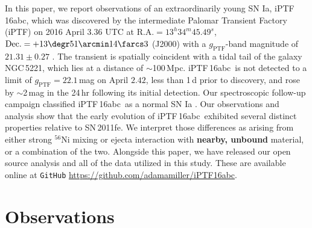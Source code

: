 \documentclass[twocolumn]{aastex61}
\newcommand{\abc}{iPTF\,16abc}
\begin{document}
In this paper, we report observations of an extraordinarily young SN Ia, \abc,
which was discovered by the intermediate Palomar Transient Factory (iPTF) on
2016 April $3.36$ UTC at $\textrm{R.A.}=13^h34^m45.49^s$,
$\textrm{Dec.}=+13\degr51\arcmin14\farcs3$ (J2000) with a
$g_\mathrm{PTF}$-band magnitude of $21.31\pm0.27$ \citep{2016ATel.8907....1M}.
The transient is spatially coincident with a tidal tail of the galaxy
NGC\,5221, which lies at a distance of $\sim$100\,Mpc. \abc\ is not detected
to a limit of $g_\mathrm{PTF}=22.1$\,mag on April $2.42$, less than 1\,d prior
to discovery, and rose by $\sim$2\,mag in the 24\,hr following its initial
detection. Our spectroscopic follow-up campaign classified \abc\ as a normal
SN Ia \citep{2016ATel.8909....1C}. Our observations and analysis show that the
early evolution of \abc\ exhibited several distinct properties relative to
SN\,2011fe. We interpret those differences as arising from either strong
$^{56}$Ni mixing or ejecta interaction with \textbf{nearby, unbound} material,
or a combination of the two. Alongside this paper, we have released our open
source analysis and all of the data utilized in this study. These are
available online at \texttt{GitHub}
\url{https://github.com/adamamiller/iPTF16abc}.



\section{Observations}
\label{sec:obs}
\end{document}
